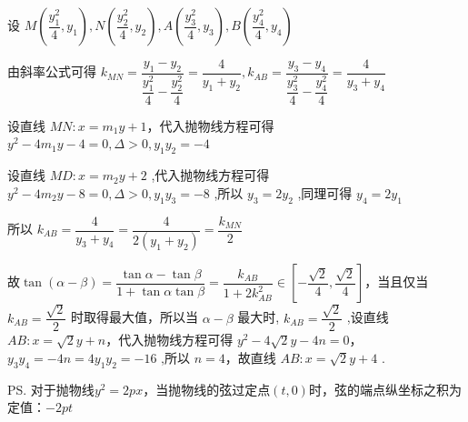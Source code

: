 \begin{enumerate}
\begin{jieda}
\begin{enumerate}
            设 $M\left( {\dfrac{{y}_{1}^{2}}{4},{y}_{1}}\right) ,N\left( {\dfrac{{y}_{2}^{2}}{4},{y}_{2}}\right) ,A\left( {\dfrac{{y}_{3}^{2}}{4},{y}_{3}}\right) ,B\left( {\dfrac{{y}_{4}^{2}}{4},{y}_{4}}\right)$
            
            由斜率公式可得 ${k}_{MN} = \dfrac{{y}_{1} - {y}_{2}}{\dfrac{{y}_{1}^{2}}{4} - \dfrac{{y}_{2}^{2}}{4}} = \dfrac{4}{{y}_{1} + {y}_{2}},{k}_{AB} = \dfrac{{y}_{3} - {y}_{4}}{\dfrac{{y}_{3}^{2}}{4} - \dfrac{{y}_{4}^{2}}{4}} = \dfrac{4}{{y}_{3} + {y}_{4}}$
            
            设直线 ${MN} : x = {m_1y} + 1$，代入抛物线方程可得 ${y}^{2} - {4m_1y} - 4 = 0, \Delta  > 0,{y}_{1}{y}_{2} =  - 4$

            设直线 ${MD} : x = m_2 y + 2$ ,代入抛物线方程可得 ${y}^{2} - 4m_2 y - 8 = 0, \Delta  > 0,{y}_{1}{y}_{3} =  - 8$ ,所以 ${y}_{3} = 2{y}_{2}$ ,同理可得 ${y}_{4} = 2{y}_{1}$
            
            所以 ${k}_{AB} = \dfrac{4}{{y}_{3} + {y}_{4}} = \dfrac{4}{2\left( {{y}_{1} + {y}_{2}}\right) } = \dfrac{{k}_{MN}}{2}$
            
            故$\tan \left( {\alpha  - \beta }\right)  = \dfrac{\tan \alpha  - \tan \beta }{1 + \tan \alpha \tan \beta } = \dfrac{k_{AB}}{1 + 2{k^2_{AB}}} \in \left[-\dfrac{\sqrt{2}}{4}, \dfrac{\sqrt{2}}{4}\right]$，当且仅当$k_{AB} = \dfrac{\sqrt{2}}{2}$ 时取得最大值，所以当 $\alpha  - \beta$ 最大时, ${k}_{AB} = \dfrac{\sqrt{2}}{2}$ ,设直线 ${AB} : x = \sqrt{2}y + n$，代入抛物线方程可得 ${y}^{2} - 4\sqrt{2}y - {4n} = 0$，${y}_{3}{y}_{4} =  - {4n} = 4{y}_{1}{y}_{2} =  - {16}$ ,所以 $n = 4$，故直线 ${AB} : x = \sqrt{2}y + 4$ .

            \ps 对于抛物线$y^2 = 2px$，当抛物线的弦过定点$(t,0)$时，弦的端点纵坐标之积为定值：$-2pt$
        \end{enumerate}
    \end{jieda}
\end{enumerate}
